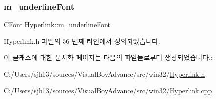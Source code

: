 \subsubsection{\texorpdfstring{m\+\_\+underline\+Font}{m\_underlineFont}}
{\footnotesize\ttfamily C\+Font Hyperlink\+::m\+\_\+underline\+Font}



Hyperlink.\+h 파일의 56 번째 라인에서 정의되었습니다.



이 클래스에 대한 문서화 페이지는 다음의 파일들로부터 생성되었습니다.\+:\begin{DoxyCompactItemize}
\item 
C\+:/\+Users/sjh13/sources/\+Visual\+Boy\+Advance/src/win32/\mbox{\hyperlink{_hyperlink_8h}{Hyperlink.\+h}}\item 
C\+:/\+Users/sjh13/sources/\+Visual\+Boy\+Advance/src/win32/\mbox{\hyperlink{_hyperlink_8cpp}{Hyperlink.\+cpp}}\end{DoxyCompactItemize}
